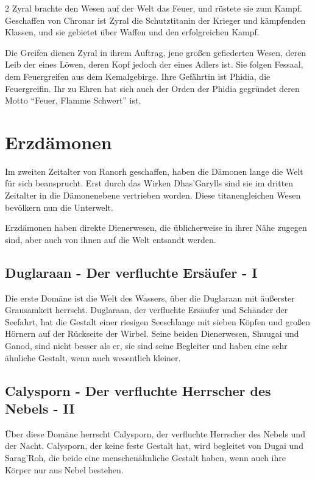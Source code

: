 \begin{multicols*}{2}
Zyral brachte den Wesen auf der Welt das Feuer, und rüstete sie zum Kampf.
Geschaffen von Chronar ist Zyral die Schutztitanin der Krieger und kämpfenden Klassen, und sie gebietet über Waffen und den erfolgreichen Kampf.

Die Greifen dienen Zyral in ihrem Auftrag, jene großen gefiederten Wesen, deren Leib der eines Löwen, deren Kopf jedoch der eines Adlers ist.
Sie folgen Fessaal, dem Feuergreifen aus dem Kemalgebirge.
Ihre Gefährtin ist Phidia, die Feuergreifin.
Ihr zu Ehren hat sich auch der Orden der Phidia gegründet deren Motto ``Feuer, Flamme Schwert'' ist.

\section{Erzdämonen}\label{sec:erzdamonen2}

Im zweiten Zeitalter von Ranorh geschaffen, haben die Dämonen lange die Welt für sich beansprucht.
Erst durch das Wirken Dhas'Garylls sind sie im dritten Zeitalter in die Dämonenebene vertrieben worden.
Diese titanengleichen Wesen bevölkern nun die Unterwelt.

Erzdämonen haben direkte Dienerwesen, die üblicherweise in ihrer Nähe zugegen sind, aber auch von ihnen auf die Welt entsandt werden.

\subsection{Duglaraan - Der verfluchte Ersäufer - I}\label{subsec:duglaraan-der-verfluchte-ersaufer}

Die erste Domäne ist die Welt des Wassers, über die Duglaraan mit äußerster Grausamkeit herrscht.
Duglaraan, der verfluchte Ersäufer und Schänder der Seefahrt, hat die Gestalt einer riesigen Seeschlange mit sieben Köpfen und großen Hörnern auf der Rückseite der Wirbel.
Seine beiden Dienerwesen, Shuugai und Ganod, sind nicht besser als er, sie sind seine Begleiter und haben eine sehr ähnliche Gestalt, wenn auch wesentlich kleiner.

\subsection{Calysporn - Der verfluchte Herrscher des Nebels - II}\label{subsec:calysporn-der-verfluchte-herrscher-des-nebels}

Über diese Domäne herrscht Calysporn, der verfluchte Herrscher des Nebels und der Nacht.
Calysporn, der keine feste Gestalt hat, wird begleitet von Dugai und Sarag'Roh, die beide eine menschenähnliche Gestalt haben, wenn auch ihre Körper nur aus Nebel bestehen.


\end{multicols*}
